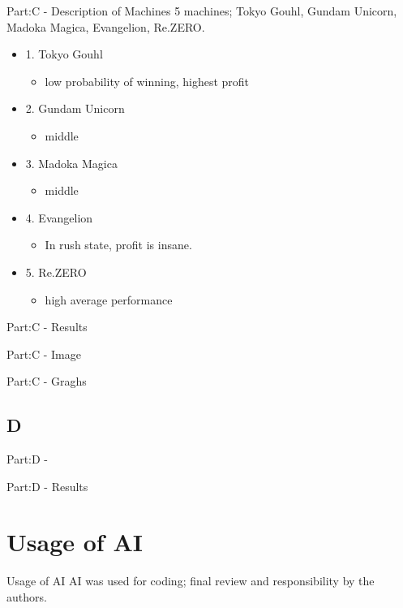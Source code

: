 \documentclass{beamer}
\begin{document}
\begin{frame}{Part:C - Description of Machines}
5 machines; Tokyo Gouhl, Gundam Unicorn, Madoka Magica, Evangelion, Re.ZERO.
\begin{itemize}
    \item 1. Tokyo Gouhl
    \begin{itemize}
        \item low probability of winning, highest profit
    \end{itemize}
    \item 2. Gundam Unicorn
    \begin{itemize}
        \item middle
    \end{itemize}
    \item 3. Madoka Magica 
    \begin{itemize}
        \item middle
    \end{itemize}
    \item 4. Evangelion
    \begin{itemize}
        \item In rush state, profit is insane.
    \end{itemize}
    \item 5. Re.ZERO
    \begin{itemize}
        \item high average performance
    \end{itemize}
\end{itemize}
\end{frame}

\begin{frame}{Part:C - Results}

    
\end{frame}


\begin{frame}{Part:C - Image}
    
\end{frame}

\begin{frame}{Part:C - Graghs}

    
\end{frame}



\subsection{D}
\begin{frame}{Part:D -}
    
\end{frame}

\begin{frame}{Part:D - Results}

    
\end{frame}

\section{Usage of AI}
\begin{frame}{Usage of AI}
    AI was used for coding; final review and responsibility by the authors.
\end{frame}
\end{document}
